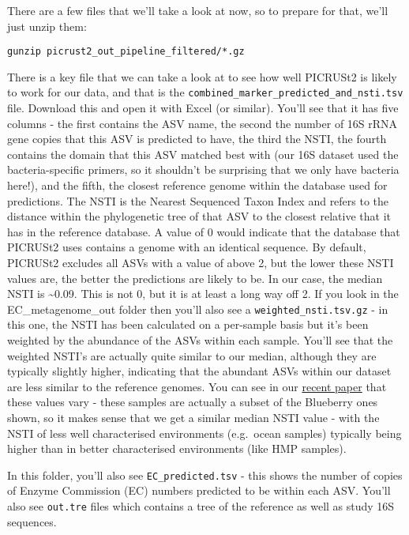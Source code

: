 \documentclass[
]{book}
\begin{document}
There are a few files that we'll take a look at now, so to prepare for that, we'll just unzip them:

\begin{verbatim}
gunzip picrust2_out_pipeline_filtered/*.gz
\end{verbatim}

There is a key file that we can take a look at to see how well PICRUSt2 is likely to work for our data, and that is the \texttt{combined\_marker\_predicted\_and\_nsti.tsv} file. Download this and open it with Excel (or similar). You'll see that it has five columns - the first contains the ASV name, the second the number of 16S rRNA gene copies that this ASV is predicted to have, the third the NSTI, the fourth contains the domain that this ASV matched best with (our 16S dataset used the bacteria-specific primers, so it shouldn't be surprising that we only have bacteria here!), and the fifth, the closest reference genome within the database used for predictions. The NSTI is the Nearest Sequenced Taxon Index and refers to the distance within the phylogenetic tree of that ASV to the closest relative that it has in the reference database. A value of 0 would indicate that the database that PICRUSt2 uses contains a genome with an identical sequence. By default, PICRUSt2 excludes all ASVs with a value of above 2, but the lower these NSTI values are, the better the predictions are likely to be. In our case, the median NSTI is \textasciitilde0.09. This is not 0, but it is at least a long way off 2. If you look in the EC\_metagenome\_out folder then you'll also see a \texttt{weighted\_nsti.tsv.gz} - in this one, the NSTI has been calculated on a per-sample basis but it's been weighted by the abundance of the ASVs within each sample. You'll see that the weighted NSTI's are actually quite similar to our median, although they are typically slightly higher, indicating that the abundant ASVs within our dataset are less similar to the reference genomes. You can see in our \href{https://academic.oup.com/bioinformatics/article/41/5/btaf269/8121151}{recent paper} that these values vary - these samples are actually a subset of the Blueberry ones shown, so it makes sense that we get a similar median NSTI value - with the NSTI of less well characterised environments (e.g.~ocean samples) typically being higher than in better characterised environments (like HMP samples).

In this folder, you'll also see \texttt{EC\_predicted.tsv} - this shows the number of copies of Enzyme Commission (EC) numbers predicted to be within each ASV. You'll also see \texttt{out.tre} files which contains a tree of the reference as well as study 16S sequences.
\end{document}

